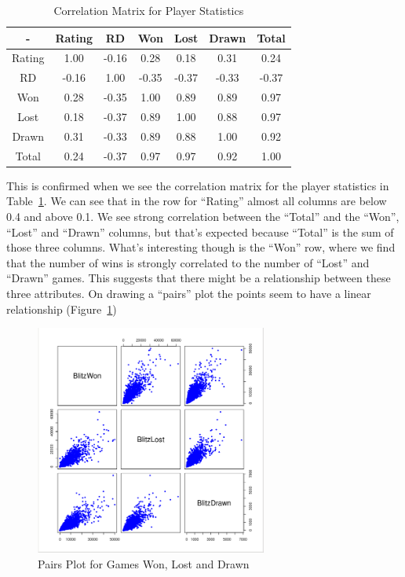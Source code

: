 \documentclass{article}
\begin{document}
\begin{table}[htp]
\begin{center}
\begin{tabular}{|c|c|c|c|c|c|c|}
\hline

- & Rating & RD & Won & Lost & Drawn & Total \\
\hline
Rating & 1.00 & -0.16 & 0.28 & 0.18 & 0.31 & 0.24\\
\hline
RD & -0.16 & 1.00 & -0.35 & -0.37 & -0.33 & -0.37\\
\hline
Won & 0.28 & -0.35 & 1.00 & 0.89 & 0.89 & 0.97\\
\hline
Lost & 0.18 & -0.37 & 0.89 & 1.00 & 0.88 & 0.97\\
\hline
Drawn & 0.31 & -0.33 & 0.89 & 0.88 & 1.00 & 0.92\\
\hline
Total & 0.24 & -0.37 & 0.97 & 0.97 & 0.92 & 1.00\\
\hline
\end{tabular}
\end{center}
\caption{Correlation Matrix for Player Statistics}
\label{tab:playercor}
\end{table}



This is confirmed when we see the correlation matrix for the player statistics in Table~\ref{tab:playercor}. We can see that in the row for ``Rating'' almost all columns are below 0.4 and above 0.1. We see strong correlation between the ``Total'' and the ``Won'', ``Lost'' and ``Drawn'' columns, but that's expected because ``Total'' is the sum of those three columns. What's interesting though is the ``Won'' row, where we find that the number of wins is strongly correlated to the number of ``Lost'' and ``Drawn'' games. This suggests that there might be a relationship between these three attributes. On drawing a ``pairs'' plot the points seem to have a linear relationship (Figure~\ref{fig:wonlostdrawn})\\


\begin{figure} [htp]
\begin{center}
\includegraphics[width=3in]{won_lost_drawn_pairs.png}
\end{center}
\caption{Pairs Plot for Games Won, Lost and Drawn}
\label{fig:wonlostdrawn}
\end{figure}
\end{document}
